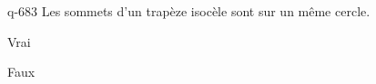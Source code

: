 \begin{truefalse}{q-683}
Les sommets d'un trapèze isocèle sont sur un même cercle.
\item* Vrai
\item Faux
\end{truefalse}


